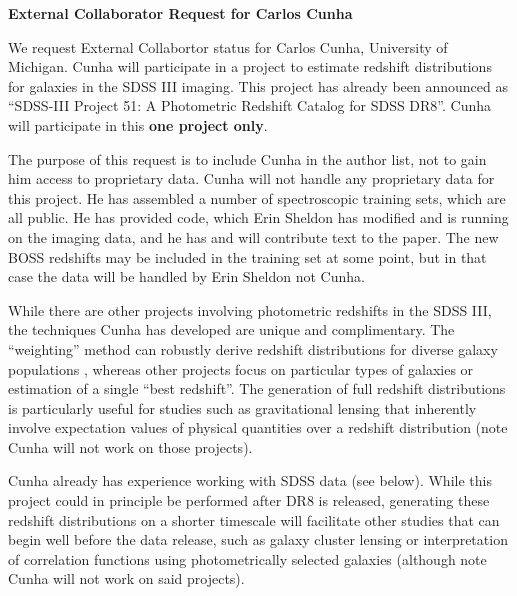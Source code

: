 \documentclass[11pt]{article}
\begin{document}
   
\begin{singlespace}      
\begin{center}
\textbf{\large{External Collaborator Request for Carlos Cunha}}\\
\end{center}


We request External Collabortor status for Carlos Cunha, University
of Michigan. Cunha will participate in a project to estimate redshift
distributions for galaxies in the SDSS III imaging. This project
has already been announced as ``SDSS-III Project 51: A Photometric
Redshift Catalog for SDSS DR8''. Cunha will participate in this {\bf one
project only}. 

The purpose of this request is to include Cunha in the author list,
not to gain him access to proprietary data. Cunha will not handle
any proprietary data for this project. He has assembled a number of
spectroscopic training sets, which are all public. He has provided 
code, which Erin Sheldon has modified and is running on the imaging
data, and he has and will contribute text to the paper. The new BOSS
redshifts may be included in the training set at some point, but in that
case the data will be handled by Erin Sheldon not Cunha.

While there are other projects involving photometric redshifts in
the SDSS III, the techniques Cunha has developed are unique and
complimentary. The ``weighting'' method can robustly derive redshift
distributions for diverse galaxy populations \citep{lim08,cun09a},
whereas other projects focus on particular types of galaxies or
estimation of a single ``best redshift''. The generation of full
redshift distributions is particularly useful for studies such as
gravitational lensing that inherently involve expectation values of
physical quantities over a redshift distribution (note Cunha will not
work on those projects).

Cunha already has experience working with SDSS data (see below). While
this project could in principle be performed after DR8 is released,
generating these redshift distributions on a shorter timescale will
facilitate other studies that can begin well before the data release,
such as galaxy cluster lensing or interpretation of correlation
functions using photometrically selected galaxies (although note Cunha
will not work on said projects). 


\end{singlespace}
\end{document}
